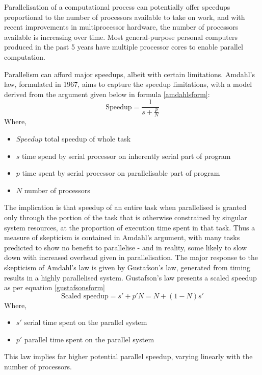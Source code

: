 Parallelisation of a computational process can potentially offer speedups proportional to the number of processors available to take on work, and with recent improvements in multiprocessor hardware, the number of processors available is increasing over time.
Most general-purpose personal computers produced in the past 5 years have multiple processor cores to enable parallel computation.

Parallelism can afford major speedups, albeit with certain limitations.
Amdahl's law, formulated in 1967, aims to capture the speedup limitations, with a model derived from the argument given below in formula \ref{amdahlsform}\cite{amdahl1967law}\cite{gustafson1988law}:
\begin{equation}
	\label{amdahlsform}
	\textrm{Speedup} = \frac{1}{s+\frac{p}{N}}
\end{equation}
Where,
\begin{itemize}
	\item \(Speedup\) total speedup of whole task
	\item \(s\) time spend by serial processor on inherently serial part of program
	\item \(p\) time spent by serial processor on parallelisable part of program
	\item \(N\) number of processors
\end{itemize}
The implication is that speedup of an entire task when parallelised is granted only through the portion of the task that is otherwise constrained by singular system resources, at the proportion of execution time spent in that task.
Thus a measure of skepticism is contained in Amdahl's argument, with many tasks predicted to show no benefit to parallelise - and in reality, some likely to slow down with increased overhead given in parallelisation. 
The major response to the skepticism of Amdahl's law is given by Gustafson's law, generated from timing results in a highly parallelised system.
Gustafson's law presents a scaled speedup as per equation \ref{gustafsonsform}
\begin{equation}
	\label{gustafsonsform}
	\textrm{Scaled speedup} = s' + p'N = N + (1-N)s'
\end{equation}
Where,
\begin{itemize}
	\item \(s'\) serial time spent on the parallel system
	\item \(p'\) parallel time spent on the parallel system
\end{itemize}
This law implies far higher potential parallel speedup, varying linearly with the number of processors.


